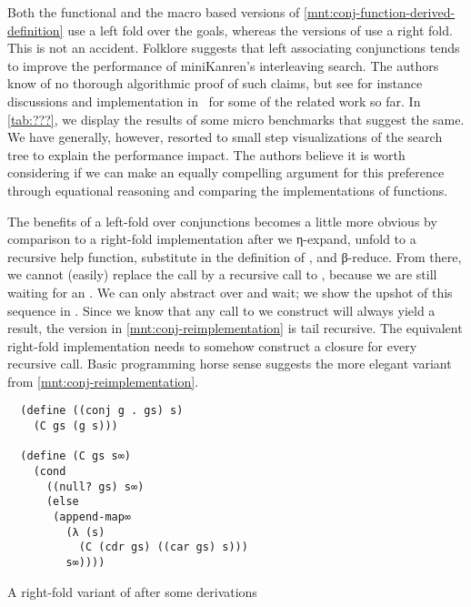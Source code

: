 \documentclass[sigplan,draft,balance,pbalance,natbib=false]{acmart}
\begin{document}
Both the functional and the macro based versions of
\cref{mnt:conj-function-derived-definition} use a left fold over the
goals, whereas the versions of  use a right fold.
This is not an accident.
%
%
Folklore suggests that left associating conjunctions tends to improve
the performance of miniKanren's interleaving search. The authors know
of no thorough algorithmic proof of such claims, but see for instance
discussions and implementation in~\cite{rosenblatt2019first} for some
of the related work so far. In \cref{tab:???}, we display the results
of some micro benchmarks that suggest the same. We have generally,
however, resorted to small step visualizations of the search tree to
explain the performance impact. The authors believe it is worth
considering if we can make an equally compelling argument for this
preference through equational reasoning and comparing the
implementations of functions.

The benefits of a left-fold over conjunctions becomes a little more
obvious by comparison to a right-fold implementation after we
η-expand, unfold to a recursive help function, substitute in the
definition of , and β-reduce. From there, we cannot
(easily) replace the  call by a recursive call
to , because we are still waiting for an .
We can only abstract over  and wait; we show the upshot
of this sequence in . Since we
know that any call to  we construct will
always yield a result, the version in \cref{mnt:conj-reimplementation}
is tail recursive. The equivalent right-fold implementation needs to
somehow construct a closure for every recursive call. Basic
programming horse sense suggests the more elegant variant from
\cref{mnt:conj-reimplementation}.

\begin{listing}
\begin{verbatim}
  (define ((conj g . gs) s)
    (C gs (g s)))

  (define (C gs s∞)
    (cond
      ((null? gs) s∞)
      (else
       (append-map∞
         (λ (s)
           (C (cdr gs) ((car gs) s)))
         s∞))))
\end{verbatim}
  \caption{A right-fold variant of  after some derivations}
  \label{mnt:conj-right-fold-definition}
\end{listing}
\end{document}
